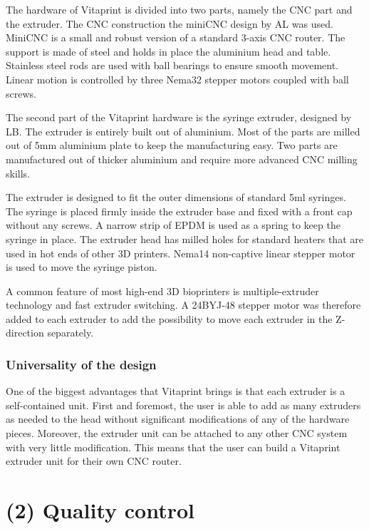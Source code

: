\documentclass[a4paper]{article}
\begin{document}
The hardware of Vitaprint is divided into two parts, namely the CNC part and the extruder. The CNC construction the miniCNC design by AL was used. MiniCNC is a small and robust version of a standard 3-axis CNC router. The support is made of steel and holds in place the aluminium head and table. Stainless steel rods are used with ball bearings to ensure smooth movement. Linear motion is controlled by three Nema32 stepper motors coupled with ball screws.

The second part of the Vitaprint hardware is the syringe extruder, designed by LB. The extruder is entirely built out of aluminium. Most of the parts are milled out of 5mm aluminium plate to keep the manufacturing easy. Two parts are manufactured out of thicker aluminium and require more advanced CNC milling skills.

The extruder is designed to fit the outer dimensions of standard 5ml syringes. The syringe is placed firmly inside the extruder base and fixed with a front cap without any screws. A narrow strip of EPDM is used as a spring to keep the syringe in place. The extruder head has milled holes for standard heaters that are used in hot ends of other 3D printers. Nema14 non-captive linear stepper motor is used to move the syringe piston.

A common feature of most high-end 3D bioprinters is multiple-extruder technology and fast extruder switching. A 24BYJ-48 stepper motor was therefore added to each extruder to add the possibility to move each extruder in the Z-direction separately.


\subsubsection{Universality of the design}\label{h.q32f2nclh4e5}

One of the biggest advantages that Vitaprint brings is that each extruder is a self-contained unit. First and foremost, the user is able to add as many extruders as needed to the head without significant modifications of any of the hardware pieces. Moreover, the extruder unit can be attached to any other CNC system with very little modification. This means that the user can build a Vitaprint extruder unit for their own CNC router.


\section{(2) Quality control}\label{h.f8237gmzmwc6}
\end{document}
